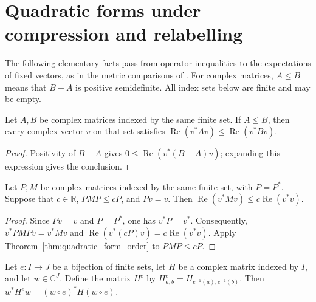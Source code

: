 \section{Quadratic forms under compression and relabelling}

The following elementary facts pass from operator inequalities to the
expectations of fixed vectors, as in the metric comparisons of
\cite[Section~8]{OpenAI2026AreaLaw}.
For complex matrices, $A\leq B$ means that $B-A$ is positive semidefinite.
All index sets below are finite and may be empty.

\begin{theorem}
  \label{thm:quadratic_form_order}
  \leanok
  Let $A,B$ be complex matrices indexed by the same finite set. If $A\leq B$,
  then every complex vector $v$ on that set satisfies
  $\operatorname{Re}(v^*Av)\leq\operatorname{Re}(v^*Bv)$.
\end{theorem}

\begin{proof}
  \leanok
  Positivity of $B-A$ gives
  $0\leq\operatorname{Re}(v^*(B-A)v)$; expanding this expression gives
  the conclusion.
\end{proof}

\begin{theorem}
  \label{thm:hermitian_compression_quadratic}
  \leanok
  Let $P,M$ be complex matrices indexed by the same finite set, with
  $P=P^*$. Suppose that $c\in\mathbb R$, $PMP\leq cP$, and $Pv=v$.
  Then $\operatorname{Re}(v^*Mv)\leq c\operatorname{Re}(v^*v)$.
\end{theorem}

\begin{proof}
  \leanok
  Since $Pv=v$ and $P=P^*$, one has $v^*P=v^*$. Consequently,
  $v^*PMPv=v^*Mv$ and
  $\operatorname{Re}(v^*(cP)v)=c\operatorname{Re}(v^*v)$.
  Apply Theorem~\ref{thm:quadratic_form_order} to $PMP\leq cP$.
\end{proof}

\begin{theorem}
  \label{thm:quadratic_form_reindex}
  \leanok
  Let $e\colon I\to J$ be a bijection of finite sets, let $H$ be a complex
  matrix indexed by $I$, and let $w\in\mathbb C^J$. Define the matrix
  $H^e$ by $H^e_{a,b}=H_{e^{-1}(a),e^{-1}(b)}$. Then
  $w^*H^e w=(w\circ e)^*H(w\circ e)$.
\end{theorem}

